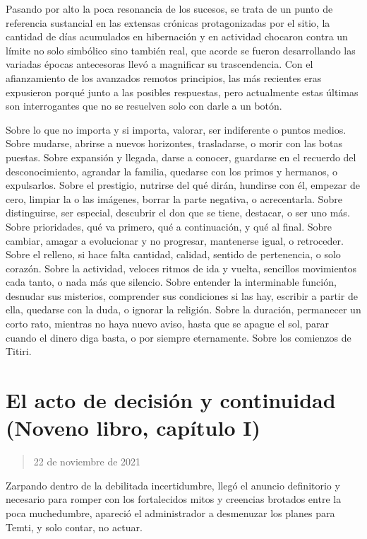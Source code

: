 \documentclass[
]{book}
\begin{document}
Pasando por alto la poca resonancia de los sucesos, se trata de un punto de referencia sustancial en las extensas crónicas protagonizadas por el sitio, la cantidad de días acumulados en hibernación y en actividad chocaron contra un límite no solo simbólico sino también real, que acorde se fueron desarrollando las variadas épocas antecesoras llevó a magnificar su trascendencia. Con el afianzamiento de los avanzados remotos principios, las más recientes eras expusieron porqué junto a las posibles respuestas, pero actualmente estas últimas son interrogantes que no se resuelven solo con darle a un botón.

Sobre lo que no importa y si importa, valorar, ser indiferente o puntos medios. Sobre mudarse, abrirse a nuevos horizontes, trasladarse, o morir con las botas puestas. Sobre expansión y llegada, darse a conocer, guardarse en el recuerdo del desconocimiento, agrandar la familia, quedarse con los primos y hermanos, o expulsarlos. Sobre el prestigio, nutrirse del qué dirán, hundirse con él, empezar de cero, limpiar la o las imágenes, borrar la parte negativa, o acrecentarla. Sobre distinguirse, ser especial, descubrir el don que se tiene, destacar, o ser uno más. Sobre prioridades, qué va primero, qué a continuación, y qué al final. Sobre cambiar, amagar a evolucionar y no progresar, mantenerse igual, o retroceder. Sobre el relleno, si hace falta cantidad, calidad, sentido de pertenencia, o solo corazón. Sobre la actividad, veloces ritmos de ida y vuelta, sencillos movimientos cada tanto, o nada más que silencio. Sobre entender la interminable función, desnudar sus misterios, comprender sus condiciones si las hay, escribir a partir de ella, quedarse con la duda, o ignorar la religión. Sobre la duración, permanecer un corto rato, mientras no haya nuevo aviso, hasta que se apague el sol, parar cuando el dinero diga basta, o por siempre eternamente. Sobre los comienzos de Titiri.

\hypertarget{el-acto-de-decisiuxf3n-y-continuidad-noveno-libro-capuxedtulo-i}{%
\section{El acto de decisión y continuidad (Noveno libro, capítulo I)}\label{el-acto-de-decisiuxf3n-y-continuidad-noveno-libro-capuxedtulo-i}}

\begin{quote}
22 de noviembre de 2021
\end{quote}

Zarpando dentro de la debilitada incertidumbre, llegó el anuncio definitorio y necesario para romper con los fortalecidos mitos y creencias brotados entre la poca muchedumbre, apareció el administrador a desmenuzar los planes para Temti, y solo contar, no actuar.
\end{document}

